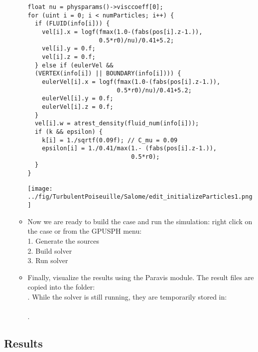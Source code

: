 \documentclass{../GPUSPHtemplate}
\begin{document}
\begin{enumerate}
\begin{itemize}
\begin{lstlisting}
float nu = physparams()->visccoeff[0];
for (uint i = 0; i < numParticles; i++) {
  if (FLUID(info[i])) {
    vel[i].x = logf(fmax(1.0-(fabs(pos[i].z-1.)),
                    0.5*r0)/nu)/0.41+5.2;
    vel[i].y = 0.f;
    vel[i].z = 0.f;
  } else if (eulerVel &&
  (VERTEX(info[i]) || BOUNDARY(info[i]))) {
    eulerVel[i].x = logf(fmax(1.0-(fabs(pos[i].z-1.)),
                         0.5*r0)/nu)/0.41+5.2;
    eulerVel[i].y = 0.f;
    eulerVel[i].z = 0.f;
  }
  vel[i].w = atrest_density(fluid_num(info[i]));
  if (k && epsilon) {
    k[i] = 1./sqrtf(0.09f); // C_mu = 0.09
    epsilon[i] = 1./0.41/max(1.- (fabs(pos[i].z-1.)),
                             0.5*r0);
  }
}
    \end{lstlisting}
    \texttt{[image: ../fig/TurbulentPoiseuille/Salome/edit\_initializeParticles1.png]}\medskip
  \item Now we are ready to build the case and run the simulation: right click on the case or from the GPUSPH menu:\\
    1. Generate the sources\\
    2. Build solver\\
    3. Run solver
  \item Finally, visualize the results using the Paravis module. The result files are copied into the folder:\\
    . While the solver is still running, they are temporarily stored in:\\
    \\
    .
  \end{itemize}
\end{enumerate}

\subsection{Results}


  

\end{document}
